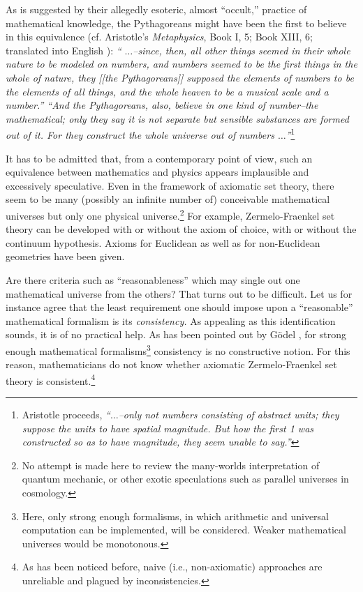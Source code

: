 As is suggested by their allegedly esoteric, almost ``occult,''
practice of mathematical knowledge, the
Pythagoreans might have been the first to believe in this equivalence
(cf. Aristotle's {\sl Metaphysics}, Book I, 5; Book XIII, 6; translated
into English
\cite{aristotle-met}): {\em ``
$\ldots$--since, then, all other things seemed in their whole nature
to be modeled on numbers, and numbers seemed to be the first things in
the whole of nature, they [[the Pythagoreans]] supposed the elements of
numbers to be the
elements of all things, and the whole heaven to be a musical scale and
a number.''
``And the Pythagoreans, also, believe
in one kind of number--the mathematical; only they say it is not
separate but sensible substances are formed out of it. For they
construct the whole universe out of numbers $ \ldots$''}\footnote{
Aristotle proceeds, {\em ``$\ldots$--only not numbers
consisting of abstract units; they suppose the units to have spatial
magnitude. But how the first 1 was constructed so as to have
magnitude, they seem unable to say.''}}

It has to be admitted that, from a contemporary point of view, such an
equivalence between mathematics and physics appears implausible and
excessively speculative.
Even in the framework of axiomatic set theory, there seem to be many
(possibly an
infinite number of) conceivable mathematical universes but only one
physical universe.\footnote{
No attempt is made here to review the many-worlds interpretation of
quantum mechanic, or other exotic speculations such as
parallel universes in cosmology.}
For example, Zermelo-Fraenkel
set theory can be developed with or without the axiom of choice, with or
without the continuum hypothesis. Axioms for Euclidean as well as for
non-Euclidean geometries have been given.

Are there criteria such as ``reasonableness'' which may single out one
mathematical universe from the others? That turns out to be
difficult. Let
us for instance agree that the least requirement one should impose upon
a
``reasonable'' mathematical formalism is its {\em consistency.} As
appealing as this identification sounds, it is of no practical help. As
has been pointed out by G\"odel
\cite{godel1}, for strong enough mathematical formalisms\footnote{
Here, only strong enough formalisms, in which arithmetic and
universal computation can be implemented, will be considered. Weaker
mathematical universes would
be monotonous.}
consistency is no constructive notion. For this reason, mathematicians
do not know whether axiomatic Zermelo-Fraenkel set theory is
consistent.\footnote{
As has been noticed before, naive (i.e., non-axiomatic) approaches
are unreliable and plagued by inconsistencies.}

